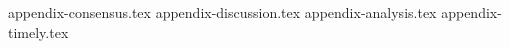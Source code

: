\appendix
\iflong
{appendix-consensus.tex}
\fi
{appendix-discussion.tex}
{appendix-analysis.tex}
\iflong
{appendix-timely.tex}
\fi
